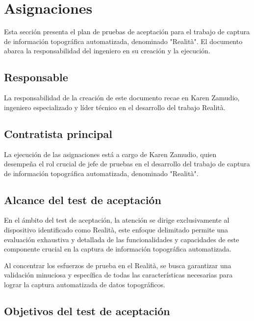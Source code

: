 \documentclass[12pt,a4paper, twoside]{article} %
\begin{document}
\section{Asignaciones}
\label{sec:orgc1c4017}


Esta sección presenta el plan de pruebas de aceptación para el trabajo de captura de información topográfica automatizada, denominado "Realità". El documento abarca la responsabilidad del ingeniero en su creación y la ejecución.


\subsection{Responsable}
\label{sec:orgdaca22c}

La responsabilidad de la creación de este documento recae en Karen Zamudio, ingeniero especializado y líder técnico en el desarrollo del trabajo Realità.


\subsection{Contratista principal}
\label{sec:descripcion-general}

La ejecución de las asignaciones está a cargo de Karen Zamudio, quien desempeña el rol crucial de jefe de pruebas en el desarrollo del trabajo de captura de información topográfica automatizada, denominado "Realità".

\subsection{Alcance del test de aceptación}
\label{sec:requisitos-especificos}


En el ámbito del test de aceptación, la atención se dirige exclusivamente al dispositivo identificado como Realità, este enfoque delimitado permite una evaluación exhaustiva y detallada de las funcionalidades y capacidades de este componente crucial en la captura de información topográfica automatizada.

Al concentrar los esfuerzos de prueba en el Realità, se busca garantizar una validación minuciosa y específica de todas las características necesarias para lograr la captura automatizada de datos topográficos.

\subsection{Objetivos del test de aceptación}
\label{sec:requisitos-especificos}
\end{document}
